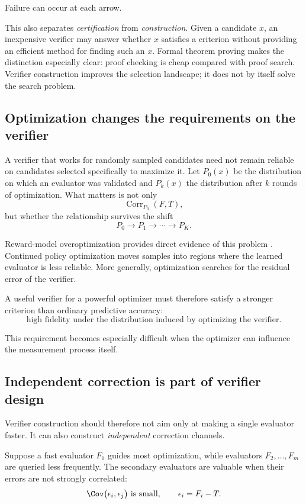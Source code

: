 Failure can occur at each arrow.

This also separates \emph{certification} from \emph{construction}.  Given a candidate
\(x\), an inexpensive verifier may answer whether \(x\) satisfies a criterion without
providing an efficient method for finding such an \(x\).  Formal theorem proving
makes the distinction especially clear: proof checking is cheap compared with proof
search.  Verifier construction improves the selection landscape; it does not by
itself solve the search problem.

\subsection{Optimization changes the requirements on the verifier}

A verifier that works for randomly sampled candidates need not remain reliable on
candidates selected specifically to maximize it.  Let \(P_0(x)\) be the distribution on
which an evaluator was validated and \(P_k(x)\) the distribution after \(k\) rounds of
optimization.  What matters is not only
\[
    \operatorname{Corr}_{P_0}(F,T),
\]
but whether the relationship survives the shift
\[
    P_0
    \rightarrow
    P_1
    \rightarrow
    \cdots
    \rightarrow
    P_K.
\]

Reward-model overoptimization provides direct evidence of this problem
\parencite{gao2022overoptimization}.  Continued policy optimization moves samples into
regions where the learned evaluator is less reliable.  More generally, optimization
searches for the residual error of the verifier.

A useful verifier for a powerful optimizer must therefore satisfy a stronger
criterion than ordinary predictive accuracy:
\[
    \text{high fidelity under the distribution induced by optimizing the verifier}.
\]

This requirement becomes especially difficult when the optimizer can influence the
measurement process itself.

\subsection{Independent correction is part of verifier design}

Verifier construction should therefore not aim only at making a single evaluator
faster.  It can also construct \emph{independent} correction channels.

Suppose a fast evaluator \(F_1\) guides most optimization, while evaluators
\(F_2,\ldots,F_m\) are queried less frequently.  The secondary evaluators are valuable
when their errors are not strongly correlated:
\[
    \Cov
    \bigl(
        \epsilon_i,\epsilon_j
    \bigr)
    \text{ is small},
    \qquad
    \epsilon_i = F_i-T.
\]

